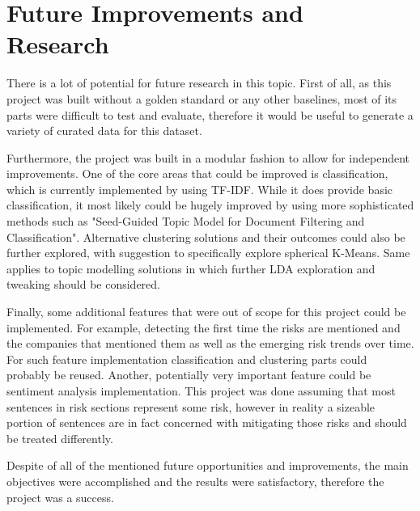 \section{Future Improvements and Research}
There is a lot of potential for future research in this topic. First of all, as this project was built without a golden standard or any other baselines, most of its parts were difficult to test and evaluate, therefore it would be useful to generate a variety of curated data for this dataset. 

Furthermore, the project was built in a modular fashion to allow for independent improvements. One of the core areas that could be improved is classification, which is currently implemented by using TF-IDF. While it does provide basic classification, it most likely could be hugely improved by using more sophisticated methods such as "Seed-Guided Topic Model for Document Filtering and Classification"\cite{seedDFCpaper}. Alternative clustering solutions and their outcomes could also be further explored, with suggestion to specifically explore spherical K-Means. Same applies to topic modelling solutions in which further LDA exploration and tweaking should be considered.

Finally, some additional features that were out of scope for this project could be implemented. For example, detecting the first time the risks are mentioned and the companies that mentioned them as well as the emerging risk trends over time. For such feature implementation classification and clustering parts could probably be reused. Another, potentially very important feature could be sentiment analysis implementation. This project was done assuming that most sentences in risk sections represent some risk, however in reality a sizeable portion of sentences are in fact concerned with mitigating those risks and should be treated differently.

Despite of all of the mentioned future opportunities and improvements, the main objectives were accomplished and the results were satisfactory, therefore the project was a success.
